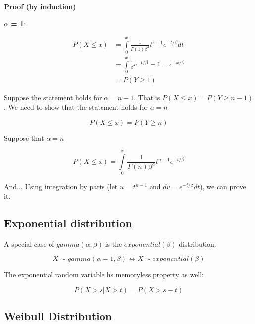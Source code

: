 \documentclass{article}
\begin{document}
\noindent \textbf{Proof (by induction)}

\textbf{$\alpha$ = 1}:

    \begin{equation*}
    \begin{split}
        P(X\leq x) &= \int\limits_0^x \frac{1}{\Gamma(1)\beta^2} t^{1-1} e^{-t/\beta} dt\\
        &= \int\limits_0^x \frac{1}{\beta} e^{-t/\beta} = 1- e^{-x/\beta}\\
        &= P(Y\geq 1)
    \end{split}
    \end{equation*}
    
Suppose the statement holds for $\alpha = n-1$. That is $P(X \leq x) = P(Y \geq n-1)$. We need to show that the statement holds for $\alpha = n$

\begin{equation*}
    P(X \leq x ) = P(Y \geq n)
\end{equation*}

Suppose that $\alpha = n$

\begin{equation*}
    P(X \leq x) = \int\limits_0^x \frac{1}{\Gamma(n)\beta^\alpha} t^{n-1} e^{-t/\beta}
\end{equation*}

And... Using integration by parts (let $u = t^{n-1}$ and $dv = e^{-t/\beta}dt$), we can prove it.

\subsection{Exponential distribution}

A special case of $gamma(\alpha,\beta)$ is the $exponential(\beta)$ distribution.

\begin{equation*}
    X \sim gamma(\alpha = 1, \beta) \iff X \sim exponential(\beta)
\end{equation*}

The exponential random variable hs memoryless property as well:

\begin{equation*}
    P(X>s | X>t) = P(X > s-t)
\end{equation*}

\subsection{Weibull Distribution}
\end{document}
